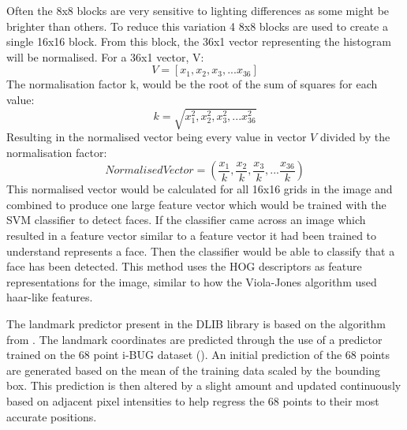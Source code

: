 \documentclass{l4proj}
\begin{document}
Often the 8x8 blocks are very sensitive to lighting differences as some might be brighter than others. To reduce this variation 4 8x8 blocks are used to create a single 16x16 block. From this block, the 36x1 vector representing the histogram will be normalised. For a 36x1 vector, V:
\[V=[x_1,x_2,x_3,...x_{36}]\]
The normalisation factor k, would be the root of the sum of squares for each value:
\[ k = \sqrt{x_1^2,x_2^2,x_3^2,...x_{36}^2} \]
Resulting in the normalised vector being every value in vector \(V\) divided by the normalisation factor:
\[Normalised Vector = (\frac{x_1}{k},\frac{x_2}{k},\frac{x_3}{k},...\frac{x_{36}}{k})\]
This normalised vector would be calculated for all 16x16 grids in the image and combined to produce one large feature vector which would be trained with the SVM classifier to detect faces. If the classifier came across an image which resulted in a feature vector similar to a feature vector it had been trained to understand represents a face. Then the classifier would be able to classify that a face has been detected. This method uses the HOG descriptors as feature representations for the image, similar to how the Viola-Jones algorithm used haar-like features.

The landmark predictor present in the DLIB library is based on the algorithm from \cite{onemilli}. The landmark coordinates are predicted through the use of a predictor trained on the 68 point i-BUG dataset (\cite{300w}). An initial prediction of the 68 points are generated based on the mean of the training data scaled by the bounding box. This prediction is then altered by a slight amount and updated continuously based on adjacent pixel intensities to help regress the 68 points to their most accurate positions.
\end{document}

